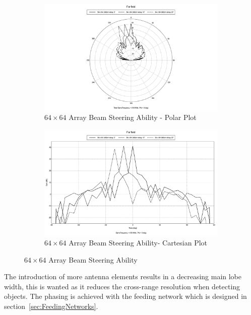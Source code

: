 \documentclass[11pt]{witseiepaper}
\begin{document}
\begin{figure}[htb]
    \centering
    \begin{subfigure}{.5\textwidth}
        \centering
            \includegraphics[width=0.9\linewidth]{SteeringBig-Polar.pdf}
            \caption{$64 \times 64$ Array Beam Steering Ability - Polar Plot}
            \label{fig:SteeringSmall-Polar}
        \end{subfigure}%
        \begin{subfigure}{.5\textwidth}
            \centering
            \includegraphics[width=0.9\linewidth]{SteeringBig-Cartesian.pdf}
            \caption{$64 \times 64$ Array Beam Steering Ability- Cartesian Plot}
                \label{fig:SteeringSmall-Cartesian}
            \end{subfigure}
\caption{$64 \times 64$ Array Beam Steering Ability}
\label{fig:SteeringSmall}
\end{figure}


The introduction of more antenna elements results in a decreasing main lobe width, this is wanted as it reduces the cross-range resolution when detecting objects\cite[p.~14,28,469]{radarHandbook}.
The phasing is achieved with the feeding network which is designed in section~\ref{sec:FeedingNetworks}.
\end{document}
